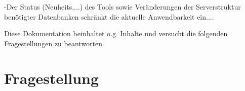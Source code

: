 \documentclass[
a4paper,     %
12pt         %
]{scrartcl}  %
\begin{document}
-Der Status (Neuheits,...) des Tools sowie Veränderungen der Serverstruktur benötigter Datenbanken schränkt die aktuelle Anwendbarkeit ein....

Diese Dokumentation beinhaltet o.g. Inhalte und versucht die folgenden Fragestellungen zu beantworten.

\section{Fragestellung} %




%
\end{document}
